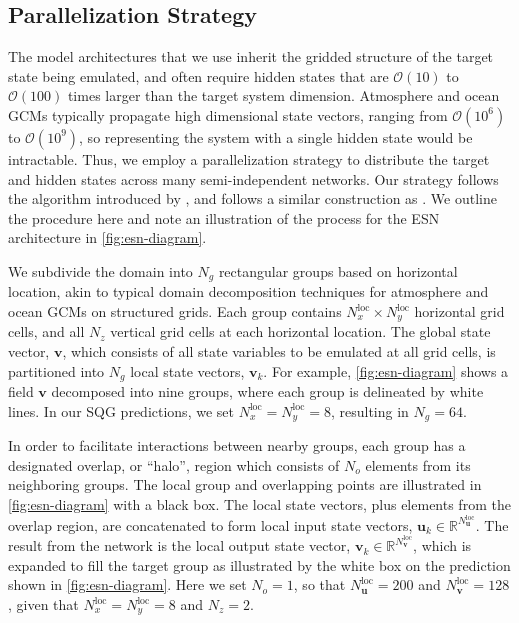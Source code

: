 \documentclass[draft]{agujournal2019}
\newcommand{\state}{\mathbf{v}}
\newcommand{\inputstate}{\mathbf{u}}
\newcommand{\localstate}{\state_{k}}
\newcommand{\localinputstate}{\inputstate_{k}}
\newcommand{\nstate}{N_{\state}}
\newcommand{\ninputstate}{N_{\inputstate}}
\newcommand{\ngroups}{N_{g}}
\newcommand{\nx}{N_{x}}
\newcommand{\ny}{N_{y}}
\newcommand{\nvertical}{N_{z}}
\newcommand{\noverlap}{N_{o}}
\newcommand{\nlocalstate}{\nstate^\text{loc}}
\newcommand{\nlocalinputstate}{\ninputstate^\text{loc}}
\newcommand{\nlocalx}{\nx^\text{loc}}
\newcommand{\nlocaly}{\ny^\text{loc}}
\newcommand{\citet}{\citeA}
\begin{document}
\subsection{Parallelization Strategy}
\label{subsec:parallelization}

The model architectures that we use inherit the gridded structure of the target
state being emulated, and often require hidden states that are
$\mathcal{O}(10)$ to $\mathcal{O}(100)$ times larger than the target system dimension.
Atmosphere and ocean GCMs typically propagate high dimensional state vectors, ranging from $\mathcal{O}(10^6)$ to $\mathcal{O}(10^9)$,
so representing the system with a single hidden state would be intractable.
Thus, we employ a parallelization strategy to distribute the target and hidden
states across many semi-independent networks.
Our strategy follows the algorithm introduced by \citet{pathak_model-free_2018},
and follows a similar construction as \citet{arcomano_machine_2020}.
We outline the procedure here and note an illustration of the process for
the ESN architecture in \cref{fig:esn-diagram}.

We subdivide the domain into $\ngroups$ rectangular groups based on horizontal location,
akin to typical domain decomposition techniques for atmosphere and ocean
GCMs on structured grids.
Each group contains
$\nlocalx\times\nlocaly$ horizontal grid cells, and all $\nvertical$
vertical grid cells at each horizontal location.
The global state vector, $\state$, which consists of all state variables to be
emulated at all grid cells, is partitioned into $\ngroups$ local state vectors,
$\localstate$.
For example, \cref{fig:esn-diagram} shows a field $\state$ decomposed into nine
groups, where each group is delineated by white lines.
In our SQG predictions, we set $\nlocalx = \nlocaly = 8$, resulting in
$\ngroups=64$.

In order to facilitate interactions between nearby groups, each group has a designated overlap, or ``halo'', region which consists of $\noverlap$ elements
from its neighboring groups.
The local group and overlapping points are illustrated in \cref{fig:esn-diagram}
with a black box.
The local state vectors, plus elements from the overlap region, are concatenated
to form local input state vectors,
$\localinputstate\in\mathbb{R}^{\nlocalinputstate}$.
The result from the network is the local output state vector,
$\localstate\in\mathbb{R}^{\nlocalstate}$,
which is expanded to fill the target group as illustrated by the
white box on the prediction shown in \cref{fig:esn-diagram}.
Here we set $\noverlap=1$, so that $\nlocalinputstate=200$ and
$\nlocalstate=128$, given that $\nlocalx=\nlocaly=8$ and $\nvertical=2$.
\end{document}
